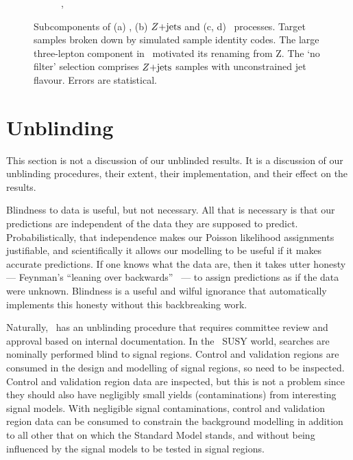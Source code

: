 \begin{figure}[tp]
\begin{subfigure}{0.48\textwidth}
\caption{\srllbb, \topother}
\label{fig:2ljets_splits_topother2}
\end{subfigure}
\caption[
Subcomponents of \diboson, $\zjets$ and rare-top processes.
]{%
Subcomponents of (a) \diboson, (b) $\zjets$ and (c, d) \topother\ processes.
Target samples broken down by simulated sample identity codes.
The large three-lepton component in \crvz\ motivated its renaming from \crz Z.
The `no filter' selection comprises $\zjets$ samples with unconstrained jet
flavour.
Errors are statistical.
}
\label{fig:2ljets_splits}
\end{figure}


\section{Unblinding}
\label{sec:2ljets_unblinding}
This section is not a discussion of our unblinded results.
It is a discussion of our unblinding procedures,
their extent, their implementation, and their effect on the results.

Blindness to data is useful, but not necessary.
All that is necessary is that our predictions are independent of the data
they are supposed to predict.
Probabilistically, that independence makes our Poisson likelihood assignments
justifiable, and scientifically it allows our modelling to be useful if it
makes accurate predictions.
If one knows what the data are, then it takes utter honesty ---
Feynman's ``leaning over backwards''~\cite{feynman1974cargo} ---
to assign predictions as if the data were unknown.
Blindness is a useful and wilful ignorance that automatically implements this
honesty without this backbreaking work.

Naturally, \atlas\ has an unblinding procedure that requires committee
review and approval based on internal documentation.
In the \atlas\ SUSY world, searches are nominally performed blind to signal
regions.
Control and validation regions are consumed in the design and modelling of
signal regions, so need to be inspected.
Control and validation region data are inspected, but this is not a problem
since they should also have negligibly small yields (contaminations) from
interesting signal models.
With negligible signal contaminations, control and validation region data can
be consumed to constrain the background modelling in addition to all other that
on which the Standard Model stands, and without being influenced by the signal
models to be tested in signal regions.


